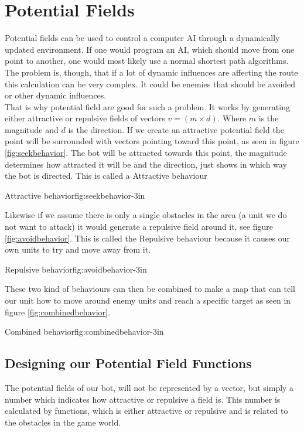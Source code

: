\section{Potential Fields}
	Potential fields can be used to control a computer AI through a dynamically updated environment. 
	If one would program an AI, which should move from one point to another, one would most likely use a normal shortest path algorithms. 
	The problem is, though, that if a lot of dynamic influences are affecting the route this calculation can be very complex. It could be 
	enemies that should be avoided or other dynamic influences. \\
	
	That is why potential field are good for such a problem. It works by generating either attractive or repulsive fields of vectors $v=(m\times d )$. 
	Where $m$ is the magnitude and $d$ is the direction. 
	If we create an attractive potential field the point will be surrounded with vectors pointing toward this point, 
	as seen in figure \ref{fig:seekbehavior}. 
	The bot will be attracted towards this point, the magnitude determines how attracted it will be and the direction, 
	just shows in which way the bot is directed. This is called a Attractive behaviour 
	
		{Attractive behavior\cite{pft}}{fig:seekbehavior}{-3in}
	
	Likewise if we assume there is only a single obstacles in the area (a unit we do not want to attack) it would generate a repulsive field around it, 
	see figure \ref{fig:avoidbehavior}. This is called the Repulsive behaviour because it causes our own units to try and move away from it.

		{Repulsive behavior\cite{pft}}{fig:avoidbehavior}{-3in}
		
	These two kind of behaviours can then be combined to make a map that can tell our unit 
	how to move around enemy units and reach a specific target as seen in figure \ref{fig:combinedbehavior}.
	
		{Combined behavior\cite{pft}}{fig:combinedbehavior}{-3in}
		
	\subsection{Designing our Potential Field Functions}		
		The potential fields of our bot, will not be represented by a vector, but simply a number which indicates how attractive or repulsive a field is. 
		This number is calculated by functions, which is either attractive or repulsive and is related to the obstacles in the game world. 
		
